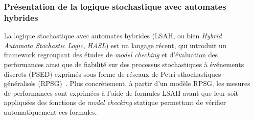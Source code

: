         \subsubsection{Présentation de la logique stochastique avec automates hybrides}
La logique stochastique avec automates hybrides (LSAH, ou bien \textit{Hybrid Automata Stochastic Logic}, \textit{HASL}) est un langage récent, qui introduit un framework regroupant des études de \textit{model checking} et d'évaluation des performances ainsi que de fiabilité sur des processus stochastiques à événements discrets (PSED) exprimés sous forme de réseaux de Petri sthochastiques généralisés (RPSG)~\cite{BDDHP11hasl}.
Plus concrètement, à partir d'un modèle RPSG, les mesures de performances sont exprimées à l'aide de formules LSAH avant que leur soit appliquées des fonctions de \textit{model checking} statique permettant de vérifier automatiquement ces formules.

